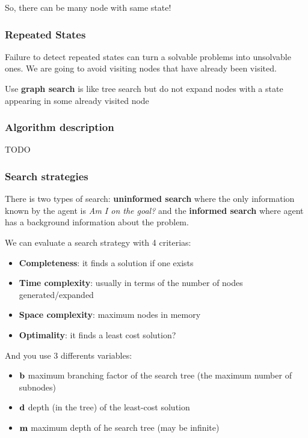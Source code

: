So, there can be many node with same state!

\subsubsection{Repeated States}

Failure  to detect  repeated states  can turn  a solvable  problems into
unsolvable ones. We are going to  avoid visiting nodes that have already
been visited.

Use \textbf{graph  search} is like tree  search but do not  expand nodes
with a state appearing in some already visited node


\subsubsection{Algorithm description}

TODO

\subsubsection{Search strategies}

There is two types of  search: \textbf{uninformed search} where the only
information known  by the agent  is \textit{Am I  on the goal?}  and the
\textbf{informed search} where agent  has a background information about
the problem.

We can evaluate a search strategy with 4 criterias:
\begin{itemize}
    \item \textbf{Completeness}: it finds a solution if one exists
    \item \textbf{Time complexity}: usually in terms of the number of nodes generated/expanded
    \item \textbf{Space complexity}: maximum nodes in memory
    \item \textbf{Optimality}: it finds a least cost solution?
\end{itemize}
And you use 3 differents variables:
\begin{itemize}
    \item $\textbf b$  maximum branching factor of the search tree (the maximum number of subnodes)
    \item $\textbf d$  depth (in the tree) of the least-cost solution
    \item $\textbf m$  maximum depth of he search tree (may be infinite)
\end{itemize}



